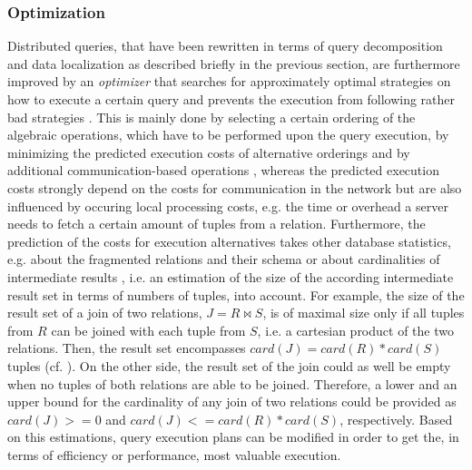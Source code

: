 \subsubsection{Optimization}
\label{sec:theo_dqp_opt}
Distributed queries, that have been rewritten in terms of query decomposition and data localization as described briefly in the previous section, are
furthermore improved by an \emph{optimizer} that searches for approximately optimal strategies on how to execute a certain query and prevents the 
execution from following rather bad strategies \cite[p.~210]{Ozsu1991}. This is mainly done by selecting a certain ordering of the algebraic operations, 
which have to be performed upon the query execution, by minimizing the predicted execution costs of alternative orderings and by additional 
communication-based operations \cite[p.~210f.]{Ozsu1991}, whereas the predicted execution costs strongly depend on the costs for communication in the 
network but are also influenced by occuring local processing costs, e.g. the time or overhead a server needs to fetch a certain amount of tuples from a
relation. Furthermore, the prediction of the costs for execution alternatives takes other database statistics, e.g. about the fragmented relations and 
their schema or about cardinalities of intermediate results \cite[p.214ff.]{Ozsu1991}, i.e. an estimation of the size of the according intermediate result 
set in terms of numbers of tuples, into account. For example, the size of the result set of a join of two relations, $J=R \bowtie S$, is of maximal
size only if all tuples from $R$ can be joined with each tuple from $S$, i.e. a cartesian product of the two relations. Then, the result set encompasses 
$card(J)=card(R)*card(S)$ tuples (cf. \cite[p.~215]{Ozsu1991}). On the other side, the result set of the join could as well be empty when no tuples of both
relations are able to be joined. Therefore, a lower and an upper bound for the cardinality of any join of two relations could be provided as $card(J)>=0$
and $card(J)<=card(R)*card(S)$, respectively. Based on this estimations, query execution plans can be modified in order to get the, in terms of efficiency
or performance, most valuable execution.
